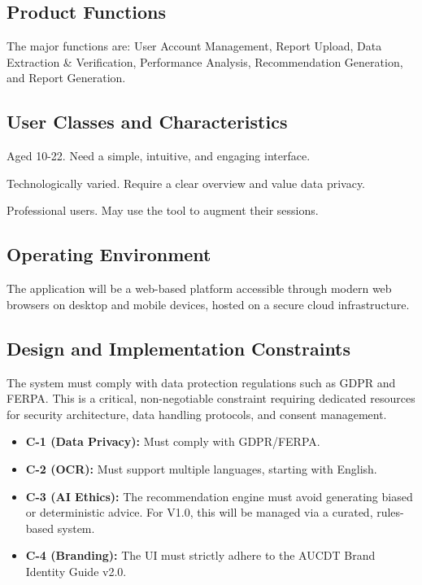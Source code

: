\documentclass[a4paper, 11pt]{article}
\begin{document}
\subsection{Product Functions}
The major functions are: User Account Management, Report Upload, Data Extraction \& Verification, Performance Analysis, Recommendation Generation, and Report Generation.

\subsection{User Classes and Characteristics}
\begin{cardcontainer}[title={User Classes}]
\begin{description}[\font=\normalfont\poppinsmedium, style=unboxed]
    \item[\poppinssemibold Students:] Aged 10-22. Need a simple, intuitive, and engaging interface.
    \item[\poppinssemibold Parents/Guardians:] Technologically varied. Require a clear overview and value data privacy.
    \item[\poppinssemibold School Counsellors:] Professional users. May use the tool to augment their sessions.
\end{description}
\end{cardcontainer}

\subsection{Operating Environment}
The application will be a web-based platform accessible through modern web browsers on desktop and mobile devices, hosted on a secure cloud infrastructure.

\subsection{Design and Implementation Constraints}
\begin{notebox}
    The system must comply with data protection regulations such as GDPR and FERPA. This is a critical, non-negotiable constraint requiring dedicated resources for security architecture, data handling protocols, and consent management.
\end{notebox}
\begin{itemize}[label={\color{AUCDTBurgundy}\faExclamationTriangle}]
    \item \textbf{C-1 (Data Privacy):} Must comply with GDPR/FERPA.
    \item \textbf{C-2 (OCR):} Must support multiple languages, starting with English.
    \item \textbf{C-3 (AI Ethics):} The recommendation engine must avoid generating biased or deterministic advice. For V1.0, this will be managed via a curated, rules-based system.
    \item \textbf{C-4 (Branding):} The UI must strictly adhere to the AUCDT Brand Identity Guide v2.0.
\end{itemize}
\end{document}
